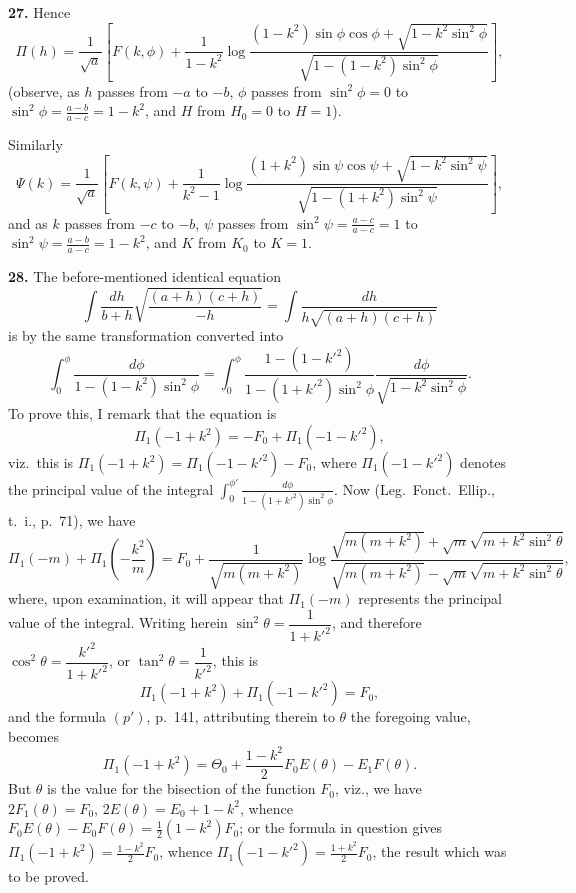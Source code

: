 \documentclass[11pt,a4paper]{article}
\begin{document}
\noindent\textbf{27.} Hence
\[
\Pi(h) = \frac{1}{\sqrt{a}} \left[ F(k, \phi) + \frac{1}{1-k^{2}} \log \frac{(1-k^{2})\sin\phi \cos\phi + \sqrt{1-k^{2}\sin^{2}\phi}}{\sqrt{1-(1-k^{2})\sin^{2}\phi}} \right],
\]
(observe, as $h$ passes from $-a$ to $-b$, $\phi$ passes from $\sin^{2}\phi = 0$ to $\sin^{2}\phi = \tfrac{a-b}{a-c} = 1-k^{2}$, and $H$ from $H_{0} = 0$ to $H = 1$).

Similarly
\[
\Psi(k) = \frac{1}{\sqrt{a}} \left[ F(k, \psi) + \frac{1}{k^{2}-1} \log \frac{(1+k^{2})\sin\psi \cos\psi + \sqrt{1-k^{2}\sin^{2}\psi}}{\sqrt{1-(1+k^{2})\sin^{2}\psi}} \right],
\]
and as $k$ passes from $-c$ to $-b$, $\psi$ passes from $\sin^{2}\psi = \tfrac{a-c}{a-c} = 1$ to $\sin^{2}\psi = \tfrac{a-b}{a-c} = 1-k^{2}$, and $K$ from $K_{0}$ to $K = 1$.

\noindent\textbf{28.} The before-mentioned identical equation
\[
\int \frac{dh}{b+h} \sqrt{\frac{(a+h)(c+h)}{-h}} = \int \frac{dh}{h\sqrt{(a+h)(c+h)}}
\]
is by the same transformation converted into
\[
\int_{0}^{\phi} \frac{d\phi}{1-(1-k^{2})\sin^{2}\phi} = \int_{0}^{\phi} \frac{1-(1-k'^{2})}{1-(1+k'^{2})\sin^{2}\phi} \frac{d\phi}{\sqrt{1-k^{2}\sin^{2}\phi}}.
\]
To prove this, I remark that the equation is
\[
\Pi_{1}(-1+k^{2}) = -F_{0} + \Pi_{1}(-1-k'^{2}),
\]
viz.\ this is $\Pi_{1}(-1+k^{2}) = \Pi_{1}(-1-k'^{2}) - F_{0}$, where $\Pi_{1}(-1-k'^{2})$ denotes the principal value of the integral $\displaystyle\int_{0}^{\phi'} \frac{d\phi}{1-(1+k'^{2})\sin^{2}\phi}$. Now (Leg.\ Fonct.\ Ellip., t.~i., p.~71), we have
\[
\Pi_{1}(-m) + \Pi_{1}\left(-\frac{k^{2}}{m}\right) = F_{0} + \frac{1}{\sqrt{m(m+k^{2})}} \log \frac{\sqrt{m(m+k^{2})} + \sqrt{m}\sqrt{m+k^{2}\sin^{2}\theta}}{\sqrt{m(m+k^{2})} - \sqrt{m}\sqrt{m+k^{2}\sin^{2}\theta}},
\]
where, upon examination, it will appear that $\Pi_{1}(-m)$ represents the principal value of the integral. Writing herein $\sin^{2}\theta = \dfrac{1}{1+k'^{2}}$, and therefore $\cos^{2}\theta = \dfrac{k'^{2}}{1+k'^{2}}$, or $\tan^{2}\theta = \dfrac{1}{k'^{2}}$, this is
\[
\Pi_{1}(-1+k^{2}) + \Pi_{1}(-1-k'^{2}) = F_{0},
\]
and the formula $(p')$, p.~141, attributing therein to $\theta$ the foregoing value, becomes
\[
\Pi_{1}(-1+k^{2}) = \Theta_{0} + \frac{1-k^{2}}{2} F_{0} E(\theta) - E_{1} F(\theta).
\]
But $\theta$ is the value for the bisection of the function $F_{0}$, viz., we have $2F_{1}(\theta) = F_{0}$, $2E(\theta) = E_{0} + 1-k^{2}$, whence $F_{0}E(\theta) - E_{0}F(\theta) = \tfrac{1}{2}(1-k^{2})F_{0}$; or the formula in question gives $\Pi_{1}(-1+k^{2}) = \tfrac{1-k^{2}}{2}F_{0}$, whence $\Pi_{1}(-1-k'^{2}) = \tfrac{1+k^{2}}{2}F_{0}$, the result which was to be proved.
\end{document}
